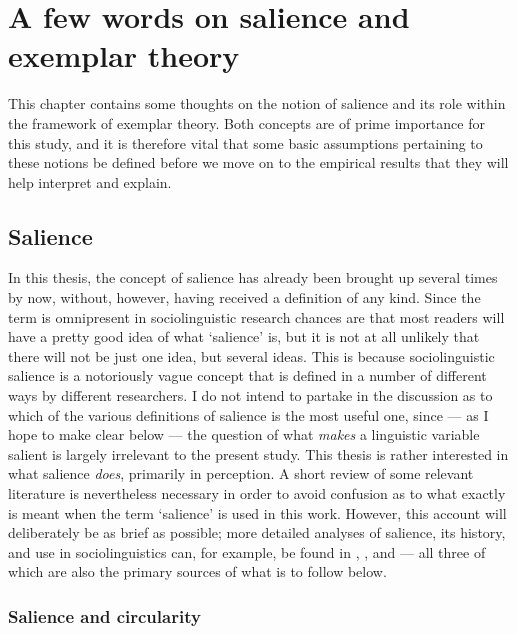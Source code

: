 \chapter{A few words on salience and exemplar theory}
\label{ch.sal}

This chapter contains some thoughts on the notion of salience and its role within the framework of exemplar theory.
Both concepts are of prime importance for this study, and it is therefore vital that some basic assumptions pertaining to these notions be defined before we move on to the empirical results that they will help interpret and explain.

	\section{Salience}
	\label{sec.sal.sal}

In this thesis, the concept of salience has already been brought up several times by now, without, however, having received a definition of any kind.
Since the term is omnipresent in sociolinguistic research chances are that most readers will have a pretty good idea of what `salience' is, but it is not at all unlikely that there will not be just one idea, but several ideas.
This is because sociolinguistic salience is a notoriously vague concept that is defined in a number of different ways by different researchers.
I do not intend to partake in the discussion as to which of the various definitions of salience is the most useful one, since --- as I hope to make clear below --- the question of what \emph{makes} a linguistic variable salient is largely irrelevant to the present study.
This thesis is rather interested in what salience \emph{does}, primarily in perception.
A short review of some relevant literature is nevertheless necessary in order to avoid confusion as to what exactly is meant when the term `salience' is used in this work.
However, this account will deliberately be as brief as possible; more detailed analyses of salience, its history, and use in sociolinguistics can, for example, be found in \cite{kerswillwilliams2002}, \cite{racz2013}, and \cite{auer2014} --- all three of which are also the primary sources of what is to follow below.

		\subsection{Salience and circularity}
		\label{sec.sal.sal.circle}

